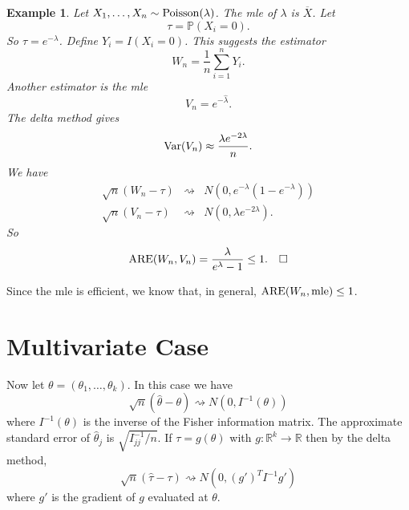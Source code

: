 \documentclass[twoside,12pt]{article}
\newtheorem{example}[theorem]{Example}
\begin{document}
\begin{example}
Let $X_1,\ldots, X_n \sim {\rm Poisson} (\lambda)$.
The mle of $\lambda$ is $\overline{X}$.
Let
$$
\tau = \mathbb{P}(X_i=0).
$$
So $\tau = e^{-\lambda}$.
Define
$Y_i = I(X_i=0)$.
This suggests the estimator
$$
W_n = \frac{1}{n}\sum_{i=1}^n Y_i.
$$
Another estimator is the mle
$$
V_n = e^{-\hat\lambda}.
$$
The delta method gives
$$
{\rm Var}(V_n) \approx \frac{\lambda e^{-2\lambda}}{n}.
$$
We have
\begin{eqnarray*}
\sqrt{n}(W_n - \tau)& \rightsquigarrow & N(0,e^{-\lambda}(1-e^{-\lambda}))\\
\sqrt{n}(V_n - \tau)& \rightsquigarrow & N(0,\lambda e^{-2\lambda}).
\end{eqnarray*}
So
$$
{\rm ARE}(W_n,V_n) = \frac{\lambda}{e^\lambda -1} \leq 1.\ \ \ \Box
$$
\end{example}

\vspace{.5cm}

Since the mle is efficient, we 
know that, in general,
${\rm ARE}(W_n,{\rm mle})\leq 1$.

\section{Multivariate Case}

Now let $\theta = (\theta_1,\ldots, \theta_k)$.
In this case we have
$$
\sqrt{n}(\hat\theta - \theta)\rightsquigarrow N(0,I^{-1}(\theta))
$$
where
$I^{-1}(\theta)$ is the inverse of the Fisher information matrix.
The approximate standard error of
$\hat\theta_j$ is
$\sqrt{I^{-1}_{jj}/n}$.
If $\tau = g(\theta)$ with
$g: \mathbb{R}^k \to \mathbb{R}$ then by the delta method,
$$
\sqrt{n}(\hat \tau - \tau)\rightsquigarrow N(0, (g')^T I^{-1}g')
$$
where
$g'$ is the gradient of $g$ evaluated at $\theta$.
\end{document}
